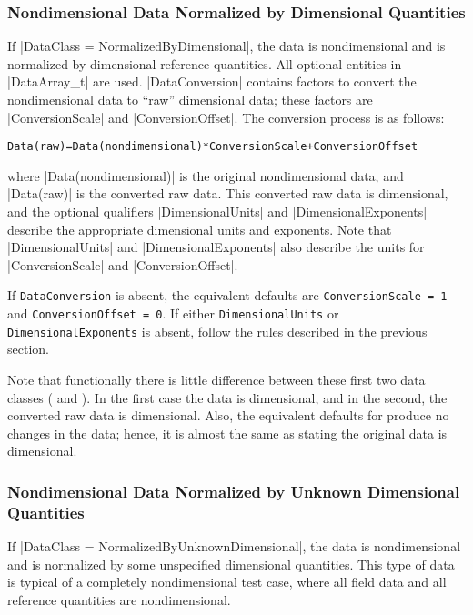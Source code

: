 \subsubsection{Nondimensional Data Normalized by Dimensional Quantities}
\label{s:data_normbydim}

If |DataClass = NormalizedByDimensional|, the data is nondimensional and is
normalized by dimensional reference quantities.  All optional entities in
|DataArray_t| are used.  |DataConversion| contains factors to convert the 
nondimensional data to ``raw'' dimensional data; these factors are
|ConversionScale| and |ConversionOffset|.  The conversion process is as
follows:
\begin{alltt}
  Data(raw) = Data(nondimensional)*ConversionScale + ConversionOffset
\end{alltt}
where |Data(nondimensional)| is the original nondimensional data, and
|Data(raw)| is the converted raw data.  This converted raw data is
dimensional, and the optional qualifiers |DimensionalUnits| and
|DimensionalExponents| describe the appropriate dimensional units and
exponents.  Note that |DimensionalUnits| and |DimensionalExponents| also
describe the units for |ConversionScale| and |ConversionOffset|.

If \texttt{DataConversion} is absent, the equivalent defaults are
\texttt{ConversionScale = 1} and \texttt{ConversionOffset = 0}.
If either \texttt{DimensionalUnits} or \texttt{DimensionalExponents} is absent,
follow the rules described in the previous section.

Note that functionally there is little difference between these first two
data classes ( and
).
In the first case the data is dimensional, and in the second, the converted
raw data is dimensional.
Also, the equivalent defaults for  produce no changes
in the data; hence, it is almost the same as stating the original data is
dimensional.

\subsubsection{Nondimensional Data Normalized by Unknown Dimensional Quantities}
\label{s:data_normbyunkdim}

If |DataClass = NormalizedByUnknownDimensional|, the data is nondimensional
and is normalized by some unspecified dimensional quantities.  This type of
data is typical of a completely nondimensional test case, where all field
data and all reference quantities are nondimensional.  

